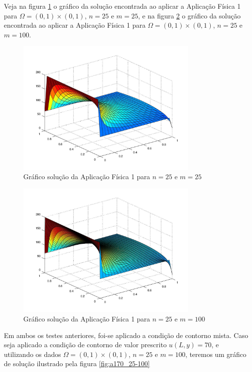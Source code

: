 \documentclass[
	11pt,				%
	oneside,			%
	a4paper,			%
	english,			%
	brazil,				%
	]{article}
\begin{document}
Veja na figura \ref{fig:a1_25-25} o gráfico da solução encontrada ao aplicar 
a Aplicação Física 1 para $\Omega = (0,1)\times(0,1)$, $n = 25$ e $m = 25$, e 
na figura \ref{fig:a1_25-100} o gráfico da solução encontrada ao aplicar 
a Aplicação Física 1 para $\Omega = (0,1)\times(0,1)$, $n = 25$ e $m = 100$.

\begin{figure}[h]
    \centering
    \includegraphics[width=0.8\textwidth]{a1_25-25}
    \caption{Gráfico solução da Aplicação Física 1 para $n = 25$ e $m = 25$}
    \label{fig:a1_25-25}
\end{figure}

\begin{figure}[h]
    \centering
    \includegraphics[width=0.8\textwidth]{a1_25-100}
    \caption{Gráfico solução da Aplicação Física 1 para $n = 25$ e $m = 100$}
    \label{fig:a1_25-100}
\end{figure}

Em ambos os testes anteriores, foi-se aplicado a condição de contorno mista. 
Caso seja aplicado a condição de contorno de valor prescrito $u(L, y) =
70$, e utilizando os dados $\Omega = (0,1)\times(0,1)$, $n = 25$ e $m = 100$, 
teremos um gráfico de solução ilustrado pela figura \ref{fig:a170_25-100}
\end{document}
